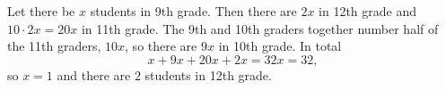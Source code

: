 Let there be $x$ students in 9th grade. Then there are $2x$ in 12th grade and $10\cdot2x=20x$ in 11th grade. The 9th and 10th graders together number half of the 11th graders, $10x$, so there are $9x$ in 10th grade. In total
\[
x+9x+20x+2x=32x=32,
\]
so $x=1$ and there are $\boxed{2}$ students in 12th grade.
